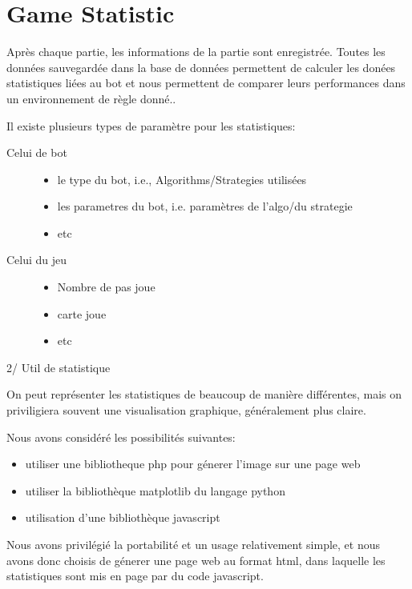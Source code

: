 \section{Game Statistic}

Après chaque partie, les informations de la partie sont enregistrée. Toutes les données sauvegardée dans la base de données permettent de calculer les donées statistiques liées au bot et nous permettent de comparer leurs performances dans un environnement de règle donné..

Il existe plusieurs types de paramètre pour les statistiques:\\

\begin{description}
\item[Celui de bot]
  \begin{itemize}
  \item le type du bot, i.e., Algorithms/Strategies utilisées
  \item les parametres du bot, i.e. paramètres de l'algo/du strategie
  \item etc
  \end{itemize}
\item[Celui du jeu]
  \begin{itemize}
  \item Nombre de pas joue
  \item carte joue
  \item etc
  \end{itemize}
\end{description}


2/ Util de statistique

On peut représenter les statistiques de beaucoup de manière différentes, mais on priviligiera souvent une visualisation graphique, généralement plus claire.

Nous avons considéré les possibilités suivantes:\\
\begin{itemize}
\item utiliser une bibliotheque php pour génerer l'image sur une page web
\item utiliser la bibliothèque matplotlib du langage python
\item utilisation d'une bibliothèque javascript
\end{itemize}

Nous avons privilégié la portabilité et un usage relativement simple, et nous avons donc choisis de génerer une page web au format html, dans laquelle les statistiques sont mis en page par du code javascript.

